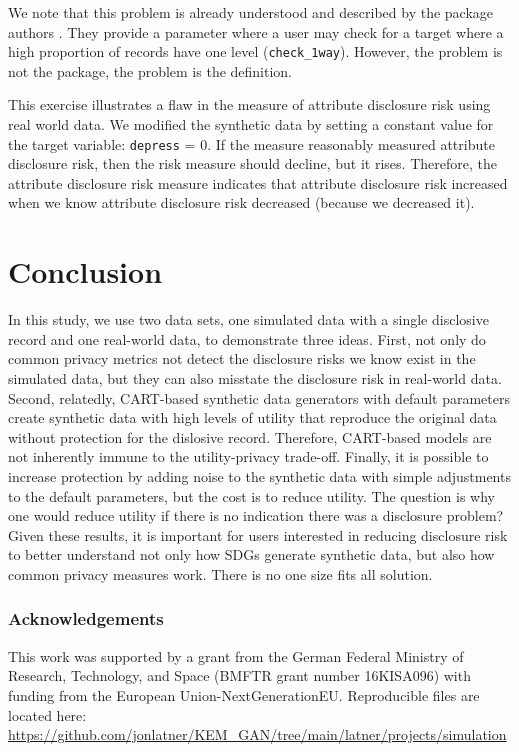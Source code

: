 \documentclass[a4paper,11pt]{style/uneceart}
\begin{document}
We note that this problem is already understood and described by the package authors \citep{raab2025practicalprivacymetricssynthetic}.  They provide a parameter where a user may check for a target where a high proportion of records have one level (\texttt{check\_1way}).  However, the problem is not the package, the problem is the definition.

This exercise illustrates a flaw in the measure of attribute disclosure risk using real world data.  We modified the synthetic data by setting a constant value for the target variable: \texttt{depress} = 0.  If the measure reasonably measured attribute disclosure risk, then the risk measure should decline, but it rises.  Therefore, the attribute disclosure risk measure indicates that attribute disclosure risk increased when we know attribute disclosure risk decreased (because we decreased it).  

\section{Conclusion}

In this study, we use two data sets, one simulated data with a single disclosive record and one real-world data, to demonstrate three ideas.  First, not only do common privacy metrics not detect the disclosure risks we know exist in the simulated data, but they can also misstate the disclosure risk in real-world data.  Second, relatedly, CART-based synthetic data generators with default parameters create synthetic data with high levels of utility that reproduce the original data without protection for the dislosive record.  Therefore, CART-based models are not inherently immune to the utility-privacy trade-off.  Finally, it is possible to increase protection by adding noise to the synthetic data with simple adjustments to the default parameters, but the cost is to reduce utility.  The question is why one would reduce utility if there is no indication there was a disclosure problem?  Given these results, it is important for users interested in reducing disclosure risk to better understand not only how SDGs generate synthetic data, but also how common privacy measures work.  There is no one size fits all solution. 

\subsubsection{Acknowledgements} This work was supported by a grant from the German Federal Ministry of Research, Technology, and Space (BMFTR grant number 16KISA096) with funding from the European Union-NextGenerationEU.  Reproducible files are located here: \url{https://github.com/jonlatner/KEM\_GAN/tree/main/latner/projects/simulation}
\end{document}
